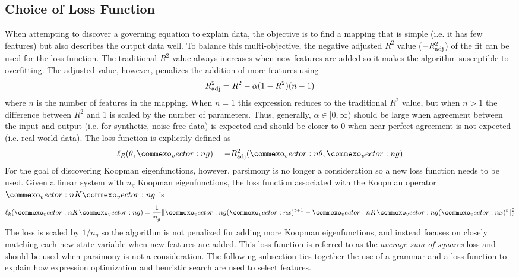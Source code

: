 \documentclass{article}
\renewcommand{\vec}[1]{\vect{#1}}
\newcommand{\mat}[1]{\vect{#1}}
\begin{document}
\subsection{Choice of Loss Function}
\label{lossfunction}
When attempting to discover a governing equation to explain data, the objective is to find a mapping that is simple (i.e. it has few features) but also describes the output data well. To balance this multi-objective, the negative adjusted $R^2$ value ($-R_{\rm adj}^2$) of the fit can be used for the loss function. The traditional $R^2$ value always increases when new features are added so it makes the algorithm susceptible to overfitting. The adjusted value, however, penalizes the addition of more features using
\begin{equation} 
R_{\rm adj}^2 = R^2 - \alpha (1-  R^2)(n-1)
\end{equation}
where $n$ is the number of features in the mapping. When $n=1$ this expression reduces to the traditional $R^2$ value, but when $n>1$ the difference between $R^2$ and 1 is scaled by the number of parameters. Thus, generally, $\alpha \in [0, \infty)$ should be large when agreement between the input and output (i.e. for synthetic, noise-free data) is expected and should be closer to 0 when near-perfect agreement is not expected (i.e. real world data). The loss function is explicitly defined as 
\begin{equation}
    \ell_R(\theta, \vec{g}) = - R_{\rm adj}^2(\vec{\theta}, \vec{g})
\end{equation}
For the goal of discovering Koopman eigenfunctions, however, parsimony is no longer a consideration so a new loss function needs to be used. Given a linear system with $n_g$ Koopman eigenfunctions, the loss function associated with the Koopman operator $\mat{K} \vec{g}$ is
\begin{equation} \ell_k(\mat{K} \vec{g}) = \frac{1}{n_g}\lVert \vec{g}(\vec{x})^{t+1} - \mat{K} \vec{g}(\vec{x})^{t}\rVert _2^2 \end{equation}
The loss is scaled by $1/n_g$ so the algorithm is not penalized for adding more Koopman eigenfunctions, and instead focuses on closely matching each new state variable when new features are added. This loss function is referred to as the \emph{average sum of squares} loss and should be used when parsimony is not a consideration. The following subsection ties together the use of a grammar and a loss function to explain how expression optimization and heuristic search are used to select features.
\end{document}
